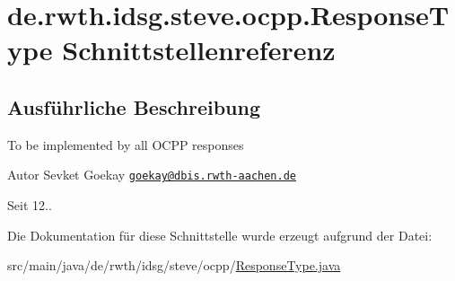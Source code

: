 \hypertarget{interfacede_1_1rwth_1_1idsg_1_1steve_1_1ocpp_1_1_response_type}{\section{de.\+rwth.\+idsg.\+steve.\+ocpp.\+Response\+Type Schnittstellenreferenz}
\label{interfacede_1_1rwth_1_1idsg_1_1steve_1_1ocpp_1_1_response_type}
}


\subsection{Ausführliche Beschreibung}
To be implemented by all O\+C\+P\+P responses

\begin{DoxyAuthor}{Autor}
Sevket Goekay \href{mailto:goekay@dbis.rwth-aachen.de}{\tt goekay@dbis.\+rwth-\/aachen.\+de} 
\end{DoxyAuthor}
\begin{DoxySince}{Seit}
12.. 
\end{DoxySince}


Die Dokumentation für diese Schnittstelle wurde erzeugt aufgrund der Datei\+:\begin{DoxyCompactItemize}
\item 
src/main/java/de/rwth/idsg/steve/ocpp/\hyperlink{_response_type_8java}{Response\+Type.\+java}\end{DoxyCompactItemize}
